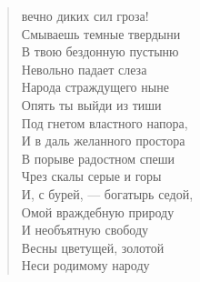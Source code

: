 \begin{verse}
\begin{patverse*}
 вечно диких сил гроза!\\
Смываешь темные твердыни\ldotst\\
В твою бездонную пустыню\\
Невольно падает слеза\\
Народа страждущего ныне\ldotst\\
Опять ты выйди из тиши\\
Под гнетом властного напора,\\
И в даль желанного простора\\
В порыве радостном спеши\\
Чрез скалы серые и горы\ldotst\\
И, с бурей, --- богатырь седой,\\
Омой враждебную природу\ldotst\\
И необъятную свободу\\
Весны цветущей, золотой\\
Неси родимому народу\ldotst
\end{patverse*}
\end{verse}

\newpage
\vspace*{0cm}


